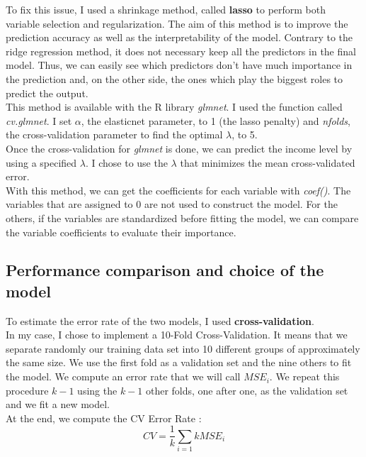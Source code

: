 \documentclass{article}
\begin{document}
\noindent To fix this issue, I used a shrinkage method, called \textbf{lasso} to perform both variable selection and regularization. The aim of this method is to improve the prediction accuracy as well as the interpretability of the model. Contrary to the ridge regression method, it does not necessary keep all the predictors in the final model. Thus, we can easily see which predictors don't have much importance in the prediction and, on the other side, the ones which play the biggest roles to predict the output.\\

\noindent This method is available with the R library \textit{glmnet}. I used the function called \textit{cv.glmnet}. I set $\alpha$, the elasticnet parameter, to 1 (the lasso penalty) and \textit{nfolds}, the cross-validation parameter to find the optimal $\lambda$, to 5.\\
Once the cross-validation for \textit{glmnet} is done, we can predict the income level by using a specified $\lambda$. I chose to use the $\lambda$ that minimizes the mean cross-validated error. \\

\noindent With this method, we can get the coefficients for each variable with \textit{coef()}. The variables that are assigned to 0 are not used to construct the model. For the others, if the variables are standardized before fitting the model, we can compare the variable coefficients to evaluate their importance.

\newpage
\subsection{Performance comparison and choice of the model}
\noindent To estimate the error rate of the two models, I used \textbf{cross-validation}.\\ 

\noindent In my case, I chose to implement a 10-Fold Cross-Validation. It means that we separate randomly our training data set into 10 different groups of approximately the same size. We use the first fold as a validation set and the nine others to fit the model. We compute an error rate that we will call $MSE_i$. We repeat this procedure $k-1$ using the $k-1$ other folds, one after one, as the validation set and we fit a new model. \\

\noindent At the end, we compute the CV Error Rate :
$$CV = \frac{1}{k}\sum_{i=1}{k}MSE_i$$
\end{document}
